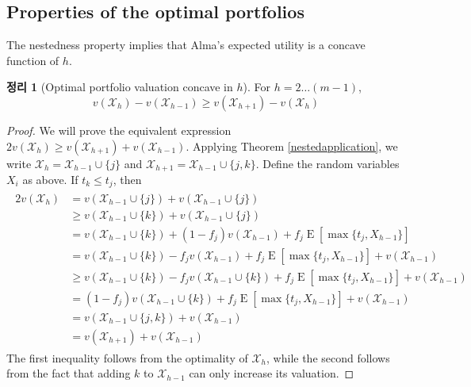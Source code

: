 \documentclass[12pt]{article} %
\newtheorem{theorem}{Theorem}
\theoremstyle{definition}
\newtheorem{theorem}{정리}
\theoremstyle{definition}
\begin{document}
\subsection{Properties of the optimal portfolios}
The nestedness property implies that Alma's expected utility is a concave function of $h$.

\begin{theorem}[Optimal portfolio valuation concave in $h$] \label{concavityinh}
For $h = 2 \dots (m-1)$, \begin{equation}v(\mathcal{X}_h) - v(\mathcal{X}_{h-1}) \geq v(\mathcal{X}_{h+1}) - v(\mathcal{X}_{h})\end{equation} 
\end{theorem}
\begin{proof}
We will prove the equivalent expression $2 v(\mathcal{X}_h) \geq v(\mathcal{X}_{h+1}) + v(\mathcal{X}_{h-1})$. Applying Theorem \ref{nestedapplication}, we write $\mathcal{X}_h = \mathcal{X}_{h-1} \cup\{j\}$ and $\mathcal{X}_{h+1} = \mathcal{X}_{h-1} \cup\{j, k\}$. Define the random variables $X_i$ as above. If $t_k \leq t_j$, then 
\begin{align}
\begin{split}
2 v(\mathcal{X}_h) &= v(\mathcal{X}_{h-1} \cup\{j\}) + v(\mathcal{X}_{h-1} \cup\{j\}) \\
&\geq v(\mathcal{X}_{h-1} \cup\{k\}) + v(\mathcal{X}_{h-1} \cup\{j\}) \\
&= v(\mathcal{X}_{h-1} \cup\{k\}) + (1 - f_j) v(\mathcal{X}_{h-1}) + f_j \operatorname{E}[\max\{t_j, X_{h-1}\}] \\
&= v(\mathcal{X}_{h-1} \cup\{k\}) - f_j v(\mathcal{X}_{h-1}) + f_j \operatorname{E}[\max\{t_j, X_{h-1}\}] + v(\mathcal{X}_{h-1})  \\
&\geq v(\mathcal{X}_{h-1} \cup\{k\})  - f_j v(\mathcal{X}_{h-1}\cup\{k\}) + f_j \operatorname{E}[\max\{t_j, X_{h-1}\}]+ v(\mathcal{X}_{h-1})\\
&= (1 - f_j) v(\mathcal{X}_{h-1} \cup\{k\})  + f_j \operatorname{E}[\max\{t_j, X_{h-1}\}]+ v(\mathcal{X}_{h-1})\\
&=  v(\mathcal{X}_{h-1} \cup\{j, k\}) + v(\mathcal{X}_{h-1})\\
&=  v(\mathcal{X}_{h+1}) + v(\mathcal{X}_{h-1})
\end{split} 
\end{align}
The first inequality follows from the optimality of $\mathcal{X}_h$, while the second follows from the fact that adding $k$ to $\mathcal{X}_{h-1}$ can only increase its valuation.


\end{proof}
\end{document}
